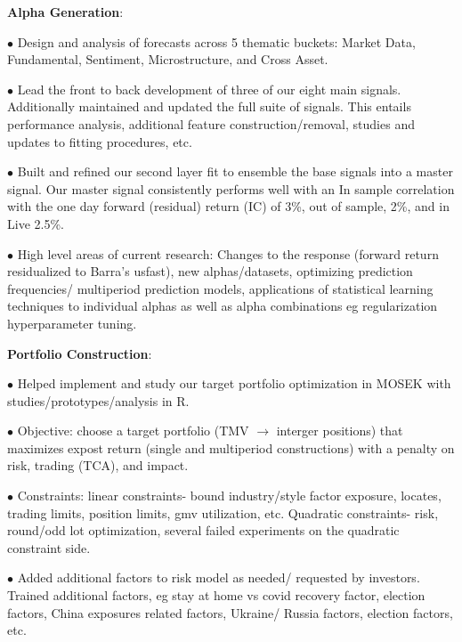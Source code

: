 \documentclass[a4paper,20pt]{article}
\newcommand{\resumeItem}[2]{
  \item\small{
    \textbf{#1}{: #2 \vspace{-2pt}}
  }
}
\begin{document}
    \resumeItem{Alpha Generation}\\ 
      $\bullet$ Design and analysis of forecasts across 5 thematic buckets:
      Market Data, Fundamental, Sentiment, Microstructure, and Cross
      Asset.

      $\bullet$ Lead the front to back development of three of our
      eight main signals. Additionally maintained and updated the full
      suite of signals. This entails performance analysis, additional
      feature construction/removal, studies and updates to fitting
      procedures, etc.

      $\bullet$ Built and refined our second layer fit to ensemble the
      base signals into a master signal. Our master signal
      consistently performs well with an In sample correlation with
      the one day forward (residual) return (IC) of 3\%, out of
      sample, 2\%, and in Live 2.5\%.

      $\bullet$ High level areas of current research: Changes to the
      response (forward return residualized to Barra's usfast), new
      alphas/datasets, optimizing prediction frequencies/ multiperiod
      prediction models, applications of statistical learning
      techniques to individual alphas as well as alpha combinations eg
      regularization hyperparameter tuning.

      \resumeItem{Portfolio Construction}\\

      $\bullet$ Helped implement and study our target portfolio
      optimization in MOSEK with studies/prototypes/analysis in R.

      $\bullet$ Objective: choose a target portfolio (TMV
      $\rightarrow$ interger positions) that maximizes expost return
      (single and multiperiod constructions) with a penalty on risk,
      trading (TCA), and impact.

      $\bullet$ Constraints: linear constraints- bound industry/style
      factor exposure, locates, trading limits, position limits, gmv
      utilization, etc. Quadratic constraints- risk, round/odd lot
      optimization, several failed experiments on the quadratic
      constraint side.

      $\bullet$ Added additional factors to risk model as needed/
      requested by investors. Trained additional factors, eg stay at home vs covid recovery factor, election factors,
      China exposures related factors, Ukraine/ Russia
      factors, election factors, etc.
\end{document}
